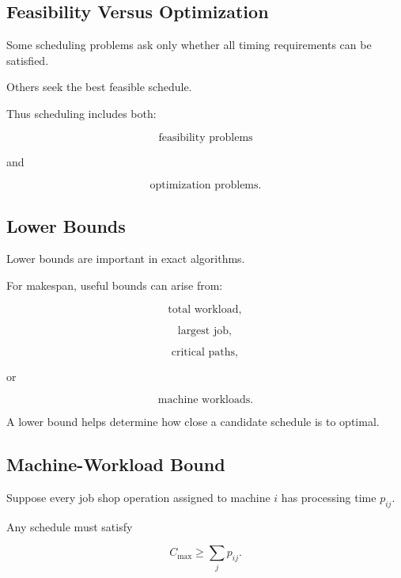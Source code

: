 \subsection{Feasibility Versus Optimization}
\label{subsec:scheduling-feasibility}

Some scheduling problems ask only whether all timing requirements can be
satisfied.

Others seek the best feasible schedule.

Thus scheduling includes both:

\[
\boxed{
\text{feasibility problems}
}
\]

and

\[
\boxed{
\text{optimization problems}.
}
\]

\subsection{Lower Bounds}
\label{subsec:scheduling-lower-bounds}

Lower bounds are important in exact algorithms.

For makespan, useful bounds can arise from:

\[
\boxed{
\text{total workload},
}
\]

\[
\boxed{
\text{largest job},
}
\]

\[
\boxed{
\text{critical paths},
}
\]

or

\[
\boxed{
\text{machine workloads}.
}
\]

A lower bound helps determine how close a candidate schedule is to optimal.

\subsection{Machine-Workload Bound}
\label{subsec:machine-workload-bound}

Suppose every job shop operation assigned to machine \(i\) has processing
time \(p_{ij}\).

Any schedule must satisfy

\[
\boxed{
C_{\max}
\geq
\sum_j
p_{ij}.
}
\]

